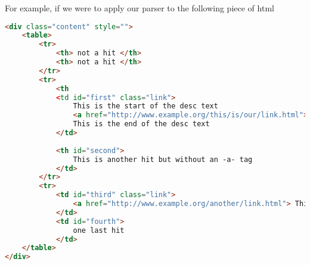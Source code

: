 For example, if we were to apply our parser to the following piece of html

\begin{lstlisting}[language=HTML]
<div class="content" style="">
	<table>
		<tr>
			<th> not a hit </th>
			<th> not a hit </th>
		</tr>
		<tr>
			<th
			<td id="first" class="link">
				This is the start of the desc text
				<a href="http://www.example.org/this/is/our/link.html"> This is our link text</a>
				This is the end of the desc text
			</td>
		
			<th id="second">
				This is another hit but without an -a- tag
			</td>
		</tr>
		<tr>
			<td id="third" class="link">
				<a href="http://www.example.org/another/link.html"> This is our link text</a>
			</td>
			<td id="fourth">
				one last hit
			</td>
	</table>
</div>
\end{lstlisting}
